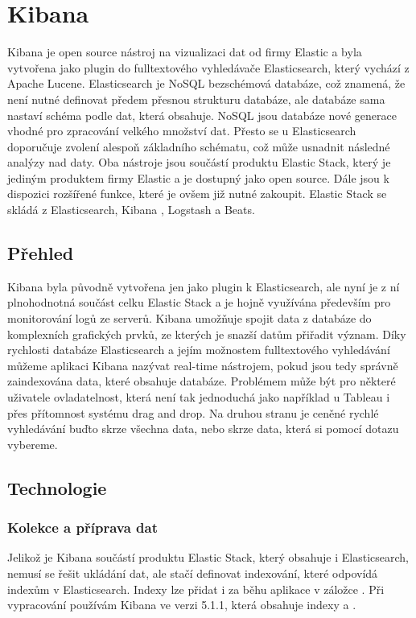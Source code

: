 \documentclass[czech,BP]{thesiskiv}
\begin{document}
 
 
 \section{Kibana}
 Kibana je open source nástroj na vizualizaci dat od firmy Elastic a byla vytvořena jako plugin do fulltextového vyhledávače Elasticsearch, který vychází z Apache Lucene. Elasticsearch je NoSQL bezschémová databáze, což znamená, že není nutné definovat předem přesnou strukturu databáze, ale databáze sama nastaví schéma podle dat, která obsahuje. NoSQL jsou databáze nové generace vhodné pro zpracování velkého množství dat.\cite{NoSQL} Přesto se u Elasticsearch doporučuje zvolení alespoň základního schématu, což může usnadnit následné analýzy nad daty.\cite{SchemaElastic} Oba nástroje jsou součástí produktu Elastic Stack, který je jediným produktem firmy Elastic a je dostupný jako open source. Dále jsou k  dispozici rozšířené funkce, které je ovšem již nutné zakoupit. Elastic Stack se skládá z Elasticsearch, Kibana
 , Logstash a Beats.
 
 \subsection{Přehled}
 Kibana byla původně vytvořena jen jako plugin k Elasticsearch, ale nyní je z ní plnohodnotná součást celku Elastic Stack a je hojně využívána především pro monitorování logů ze serverů. Kibana umožňuje spojit data z databáze do komplexních grafických prvků, ze kterých je snazší datům přiřadit význam. Díky rychlosti databáze Elasticsearch a jejím možnostem fulltextového vyhledávání můžeme aplikaci Kibana nazývat real-time nástrojem, pokud jsou tedy správně zaindexována data, které obsahuje databáze. Problémem může být pro některé uživatele ovladatelnost, která není tak jednoduchá jako například u Tableau i přes přítomnost systému drag and drop. Na druhou stranu je ceněné rychlé vyhledávání buďto skrze všechna data, nebo skrze data, která si pomocí dotazu vybereme.

 \subsection{Technologie}
 \subsubsection{Kolekce a příprava dat}
 Jelikož je Kibana součástí produktu Elastic Stack, který obsahuje i Elasticsearch, nemusí se řešit ukládání dat, ale stačí definovat indexování, které odpovídá indexům v Elasticsearch. Indexy lze přidat i za běhu aplikace v záložce . Při vypracování používám Kibana ve verzi 5.1.1, která obsahuje indexy  a .
\end{document}
